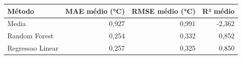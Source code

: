 \begin{tabular}{lrrr}
\toprule
Método & MAE médio (°C) & RMSE médio (°C) & R² médio \\
\midrule
Media & 0,927 & 0,991 & -2,362 \\
Random Forest & 0,254 & 0,332 & 0,852 \\
Regressao Linear & 0,257 & 0,325 & 0,850 \\
\bottomrule
\end{tabular}
